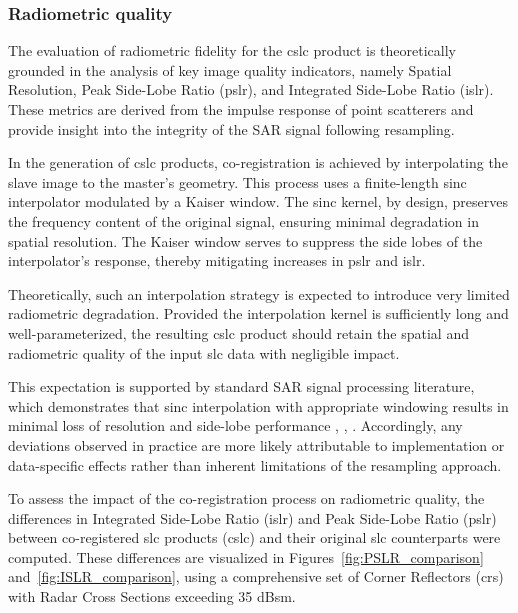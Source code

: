 \subsubsection{Radiometric quality}
\label{sec:cslc_radiometric_quality}

The evaluation of radiometric fidelity for the \acs{cslc} product is theoretically grounded in the analysis of key image quality indicators, namely Spatial Resolution, Peak Side-Lobe Ratio (\acs{pslr}), and Integrated Side-Lobe Ratio (\acs{islr}). These metrics are derived from the impulse response of point scatterers and provide insight into the integrity of the SAR signal following resampling.

In the generation of \acs{cslc} products, co-registration is achieved by interpolating the slave image to the master’s geometry. This process uses a finite-length sinc interpolator modulated by a Kaiser window. The sinc kernel, by design, preserves the frequency content of the original signal, ensuring minimal degradation in spatial resolution. The Kaiser window serves to suppress the side lobes of the interpolator's response, thereby mitigating increases in \acs{pslr} and \acs{islr}.

Theoretically, such an interpolation strategy is expected to introduce very limited radiometric degradation. Provided the interpolation kernel is sufficiently long and well-parameterized, the resulting \acs{cslc} product should retain the spatial and radiometric quality of the input \acs{slc} data with negligible impact.

This expectation is supported by standard SAR signal processing literature, which demonstrates that sinc interpolation with appropriate windowing results in minimal loss of resolution and side-lobe performance \cite{Cumming2005}, \cite{Moreira2013}, \cite{Soumekh1999}. Accordingly, any deviations observed in practice are more likely attributable to implementation or data-specific effects rather than inherent limitations of the resampling approach. 

To assess the impact of the co-registration process on radiometric quality, the differences in Integrated Side-Lobe Ratio (\acs{islr}) and Peak Side-Lobe Ratio (\acs{pslr}) between co-registered \acs{slc} products (\acs{cslc}) and their original \acs{slc} counterparts were computed. These differences are visualized in Figures~\ref{fig:PSLR_comparison} and~\ref{fig:ISLR_comparison}, using a comprehensive set of Corner Reflectors (\acs{cr}s) with Radar Cross Sections exceeding 35 dBsm. 

